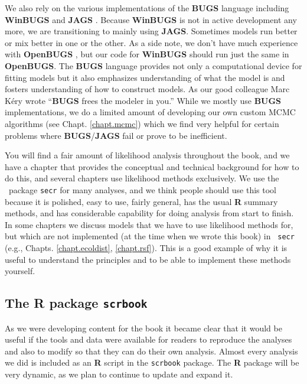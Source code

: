 We also rely on the various implementations of the {\bf BUGS}
language including {\bf WinBUGS} \citep{lunn_etal:2000} and {\bf JAGS}
\citep{plummer:2003}.  Because {\bf WinBUGS} is not in active development
any more, we are transitioning to mainly using {\bf JAGS}.  Sometimes
models run better or mix better in one or the other. As a side note,
we don't have much experience with {\bf OpenBUGS}
\citep{thomas_etal:2006}, but our code for {\bf WinBUGS} should run
just the same in {\bf OpenBUGS}. The {\bf BUGS} language provides not
only a computational device for fitting models but it also emphasizes
understanding of what the model is and fosters understanding of how to
construct models.
As our good colleague Marc K\'{e}ry wrote
\citep[][p. 30]{kery:2010}
``{\bf BUGS} frees the modeler in you.''
While we mostly use {\bf BUGS} implementations,
we do a limited amount of developing our own custom MCMC algorithms
(see Chapt. \ref{chapt.mcmc}) which we find very helpful for certain
problems where {\bf BUGS}/{\bf JAGS} fail or prove to be inefficient.

You will find a fair amount of likelihood analysis throughout the book,
 and we have a chapter that
provides the conceptual and technical background for how to do this,
and several chapters use likelihood methods exclusively. We use the
\R~package \mbox{\tt secr} \citep{efford_etal:2009euring} for many
analyses, and we think people should use this tool because it is polished,
easy to use, fairly general, has the usual {\bf R} summary methods,
and has considerable capability for doing analysis from start to
finish. In some chapters we discuss models that we have to use
likelihood methods for, but which are not implemented (at the time
when we wrote this book) in \mbox{\tt
  secr} (e.g., Chapts. \ref{chapt.ecoldist}, \ref{chapt.rsf}). This is
a good example of why it is useful to understand the principles and to
be able to implement these methods yourself.

\subsection*{The R package {\tt scrbook}}

As we were developing content for the book it became clear that it
would be useful if the tools and data were available for
readers to reproduce the analyses and also to modify so that they can
do their own analysis.  Almost every analysis we did is included as an
{\bf R} script in the \mbox{\tt scrbook} package.
The {\bf R} package will be very dynamic, as we plan to
continue to update and expand it.

